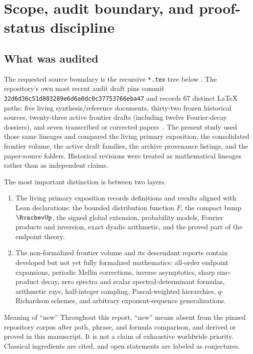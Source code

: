 \documentclass[11pt]{article}
\theoremstyle{definition}
\theoremstyle{remark}
\begin{document}
\clearpage

\section{Scope, audit boundary, and proof-status discipline}
\label{p4:sec:audit}

\subsection{What was audited}

The requested source boundary is the recursive \texttt{*.tex} tree below
.  The repository's own most recent audit draft
pins commit \nolinkurl{32d6d36c51d803289e6d6a0dc0c37753766eba47} and records 67
distinct LaTeX paths: five living synthesis/reference documents, thirty-two frozen
historical sources, twenty-three active frontier drafts (including twelve Fourier-decay
dossiers), and seven transcribed or corrected papers~\cite{p4:ReshetnikovRepo}.  The present study used those same lineages and compared the living primary exposition, the consolidated frontier
volume, the active draft families, the archive provenance listings, and the paper-source
folders.  Historical revisions were treated as mathematical lineages rather than as
independent claims.

The most important distinction is between two layers.
\begin{enumerate}[label=(\roman*),leftmargin=2.2em]
\item The living primary exposition records definitions and results aligned with Lean
      declarations: the bounded distribution function \(F\), the compact bump \(\RvachevUp\),
      the signed global extension, probability models, Fourier products and inversion,
      exact dyadic arithmetic, and the proved part of the endpoint theory.
\item The non-formalized frontier volume and its descendant reports contain developed
      but not yet fully formalized mathematics: all-order endpoint expansions,
      periodic Mellin corrections, inverse asymptotics, sharp sinc-product decay,
      zero spectra and scalar spectral-determinant formulas, arithmetic rays,
      half-integer sampling, Pascal-weighted hierarchies, \(q\)-Richardson schemes,
      and arbitrary exponent-sequence generalizations.
\end{enumerate}

\begin{statusboxPartiv}{Meaning of ``new''}
Throughout this report, ``new'' means absent from the pinned repository corpus after
path, phrase, and formula comparison, and derived or proved in this manuscript.  It is
not a claim of exhaustive worldwide priority.  Classical ingredients are cited, and
open statements are labeled as conjectures.
\end{statusboxPartiv}
\end{document}
